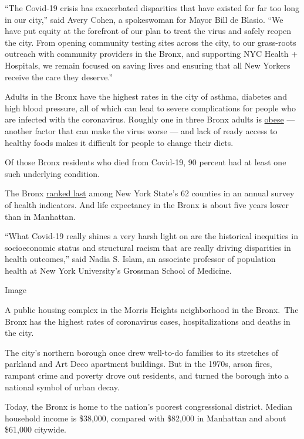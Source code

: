 ``The Covid-19 crisis has exacerbated disparities that have existed for
far too long in our city,'' said Avery Cohen, a spokeswoman for Mayor
Bill de Blasio. ``We have put equity at the forefront of our plan to
treat the virus and safely reopen the city. From opening community
testing sites across the city, to our grass-roots outreach with
community providers in the Bronx, and supporting NYC Health + Hospitals,
we remain focused on saving lives and ensuring that all New Yorkers
receive the care they deserve.''

Adults in the Bronx have the highest rates in the city of asthma,
diabetes and high blood pressure, all of which can lead to severe
complications for people who are infected with the coronavirus. Roughly
one in three Bronx adults is
\href{https://a816-health.nyc.gov/hdi/epiquery/visualizations?PageType=tsi\&PopulationSource=CHS\&Topic=1\&Subtopic=24\&Indicator=Overweight\%20and\%20Obesity\&Year=2017}{obese}
--- another factor that can make the virus worse --- and lack of ready
access to healthy foods makes it difficult for people to change their
diets.

Of those Bronx residents who died from Covid-19, 90 percent had at least
one such underlying condition.

The Bronx
\href{https://www.countyhealthrankings.org/app/new-york/2019/rankings/outcomes/overall}{ranked
last} among New York State's 62 counties in an annual survey of health
indicators. And life expectancy in the Bronx is about five years lower
than in Manhattan.

``What Covid-19 really shines a very harsh light on are the historical
inequities in socioeconomic status and structural racism that are really
driving disparities in health outcomes,'' said Nadia S. Islam, an
associate professor of population health at New York University's
Grossman School of Medicine.

Image

A public housing complex in the Morris Heights neighborhood in the
Bronx.~The Bronx has the highest rates of coronavirus cases,
hospitalizations and deaths in the city.

The city's northern borough once drew well-to-do families to its
stretches of parkland and Art Deco apartment buildings. But in the
1970s, arson fires, rampant crime and poverty drove out residents, and
turned the borough into a national symbol of urban decay.

Today, the Bronx is home to the nation's poorest congressional district.
Median household income is \$38,000, compared with \$82,000 in Manhattan
and about \$61,000 citywide.

